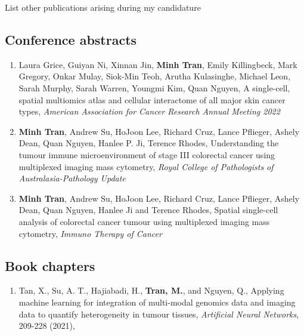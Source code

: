 \begin{instructional}
    List other publications arising during my candidature
    
    \subsection*{Conference abstracts}
    \begin{enumerate}

    \item Laura Grice, Guiyan Ni, Xinnan Jin, \textbf{Minh Tran}, Emily Killingbeck, Mark Gregory, Onkar Mulay, Siok-Min Teoh, Arutha Kulasinghe, Michael Leon, Sarah Murphy, Sarah Warren, Youngmi Kim, Quan Nguyen, A single-cell, spatial multiomics atlas and cellular interactome of all major skin cancer types, \textit{American Association for Cancer Research Annual Meeting 2022}
    
    \item \textbf{Minh Tran}, Andrew Su, HoJoon Lee, Richard Cruz, Lance Pflieger, Ashely Dean, Quan Nguyen, Hanlee P. Ji, Terence Rhodes, Understanding the tumour immune microenvironment of stage III colorectal cancer using multiplexed imaging mass cytometry, \textit{Royal College of Pathologists of Australasia-Pathology Update}
    
    \item \textbf{Minh Tran}, Andrew Su, HoJoon Lee, Richard Cruz, Lance Pflieger, Ashely Dean, Quan Nguyen, Hanlee Ji and Terence Rhodes, Spatial single-cell analysis of colorectal cancer tumour using multiplexed imaging mass cytometry, \textit{Immuno Therapy of Cancer}
    \end{enumerate}

    \subsection*{Book chapters} 

    \begin{enumerate}

    \item \cite{tan2021applying} Tan, X., Su, A. T., Hajiabadi, H., \textbf{Tran, M.}, and Nguyen, Q., Applying machine learning for integration of multi-modal genomics data and imaging data to quantify heterogeneity in tumour tissues, \textit{Artificial Neural Networks}, 209-228 (2021),


    \end{enumerate}

\end{instructional}


